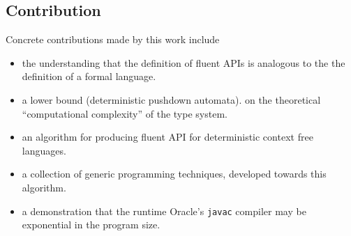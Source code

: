 \subsection{Contribution}
Concrete contributions made by this work include
\begin{itemize}
  \item the understanding that the definition of fluent APIs is analogous to the 
      the definition of a formal language.
  \item a lower bound (deterministic pushdown automata). 
    on the theoretical ``computational complexity'' of the \Java type system.
  \item an algorithm for producing fluent API for deterministic context free languages.
  \item a collection of generic programming techniques, developed towards this algorithm. 
  \item a demonstration that the runtime Oracle's \texttt{javac} compiler may be exponential in the program size. 
\end{itemize}
